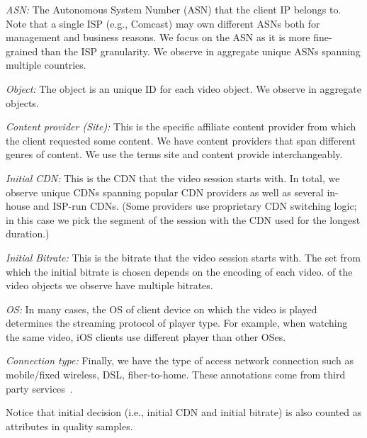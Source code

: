 \begin{packedenumerate}
\item \emph{ASN:} The Autonomous System Number (ASN) that the client IP belongs
 to. Note that a single ISP (e.g., Comcast) may own different ASNs both
 for management and business reasons. We focus on the ASN as it is more fine-grained
 than the ISP granularity.  We observe in aggregate \fillme unique ASNs
  spanning multiple countries.

\item \emph{Object:} The object is an unique ID for each video object. We observe in aggregate \fillme objects.

\item \emph{Content provider (Site):} This is the specific affiliate content
provider from which the client requested some content. We have  \fillme content
providers that span different genres of content.  We use the terms site and
content provide interchangeably.

\item \emph{Initial CDN:} This is the CDN that the video session starts with.  In total, we observe
\fillme unique CDNs spanning popular CDN providers as well as several in-house and
ISP-run CDNs. (Some providers use proprietary CDN switching logic; in
this case we pick the segment of the session with the CDN used for the longest
duration.)

\item \emph{Initial Bitrate:} This is the bitrate that the video session starts with. The set from which the initial bitrate is chosen depends on the encoding of each video. \fillme of the video objects we observe have multiple bitrates.

\item \emph{OS:} In many cases, the OS of client device on which the video is played determines the streaming protocol of player type. For example, when watching the same video, iOS clients use different player than other OSes.

\item \emph{Connection type:} Finally, we  have the type of
access network connection such  as
 mobile/fixed wireless, DSL, fiber-to-home. These annotations come from third party services~\cite{quova}.

Notice that initial decision (i.e., initial CDN and initial bitrate) is also counted as attributes in quality samples.

\end{packedenumerate}

